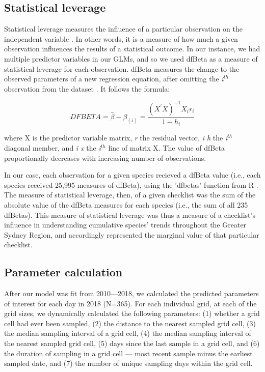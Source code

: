 \documentclass[9pt,twocolumn,twoside,lineno]{pnas-new}
\begin{document}
{\subsection*{Statistical leverage} Statistical leverage measures the influence of a particular observation on the independent variable \cite{cook1977detection}. In other words, it is a measure of how much a given observation influences the results of a statistical outcome. In our instance, we had multiple predictor variables in our GLMs, and so we used dfBeta as a measure of statistical leverage for each observation. dfBeta measures the change to the observed parameters of a new regression equation, after omitting the \textit{i$^{th}$} observation from the dataset \cite{belsley1980regression}. It follows the formula:

\begin{equation}
D F B E T A=\hat{\beta}-\beta_{(i)}=\frac{\left(X^{\prime} X\right)^{-1} X_{i} r_{i}}{1-h_{i}}
\end{equation}

where X is the predictor variable matrix, \textit{r} the residual vector, \textit{i h} the \textit{i$^{th}$} diagonal member, and \textit{i x} the \textit{i$^{th}$} line of matrix X. The value of dfBeta proportionally decreases with increasing number of observations.

In our case, each observation for a given species recieved a dfBeta value (i.e., each species received 25,995 measures of dfBeta), using the 'dfbetas' function from R \cite{rcoreteam2018r}. The measure of statistical leverage, then, of a given checklist was the sum of the absolute value of the dfBeta measures for each species (i.e., the sum of all 235 dfBetas). This measure of statistical leverage was thus a measure of a checklist's influence in understanding cumulative species' trends throughout the Greater Sydney Region, and accordingly represented the marginal value of that particular checklist.

\subsection*{Parameter calculation} After our model was fit from 2010---2018, we calculated the predicted parameters of interest for each day in 2018 (N=365). For each individual grid, at each of the grid sizes, we dynamically calculated the following parameters: (1) whether a grid cell had ever been sampled, (2) the distance to the nearest sampled grid cell, (3) the median sampling interval of a grid cell, (4) the median sampling interval of the nearest sampled grid cell, (5) days since the last sample in a grid cell, and (6) the duration of sampling in a grid cell --- most recent sample minus the earliest sampled date, and (7) the number of unique sampling days within the grid cell.

}
\end{document}
